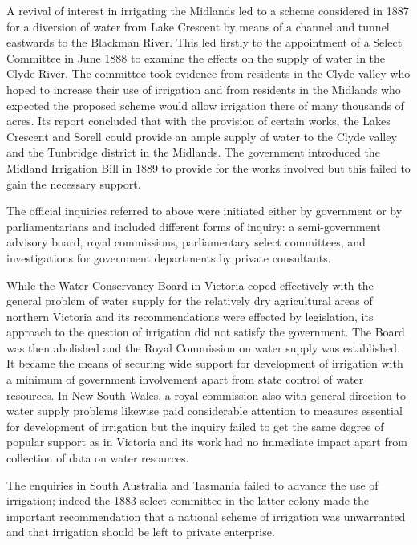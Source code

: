 A revival of interest in irrigating the Midlands led to a scheme
considered in 1887 for a diversion of water from Lake Crescent
 by means of a channel and tunnel eastwards to
the Blackman River.   This led firstly to the
appointment of a Select Committee in June 1888 to examine the effects
on the supply of water in the Clyde River.  The
committee took evidence from residents in the Clyde valley who hoped
to increase their use of irrigation and from residents in the Midlands
who expected the proposed scheme would allow irrigation there of many
thousands of acres.  Its report concluded that with the provision of
certain works, the Lakes Crescent and Sorell  could
provide an ample supply of water to the Clyde valley and the Tunbridge
district  in the Midlands.  The government introduced
the Midland Irrigation Bill  in
1889 to provide for the works involved but this failed to gain the
necessary support.

\closure
The official inquiries referred to above were initiated either by
government or by parliamentarians and included different forms of
inquiry: a semi-govern\-ment advisory board, royal commissions,
parliamentary select committees, and investigations for government
departments by private consultants.

While the Water Conservancy Board in Victoria coped effectively with
the general problem of water supply for the relatively dry
agricultural areas of northern Victoria and its recommendations were
effected by legislation, its approach to the question of irrigation
did not satisfy the government.  The Board was then abolished and the
Royal Commission on water supply was established.  It became the
means of securing wide support for development of irrigation with a
minimum of government involvement apart from state control of water
resources.  In New South Wales, a royal commission also with general
direction to water supply problems likewise paid considerable
attention to measures essential for development of irrigation but the
inquiry failed to get the same degree of popular support as in
Victoria and its work had no immediate impact apart from collection of
data on water resources.

The enquiries in South Australia and Tasmania failed to advance the
use of irrigation; indeed the 1883 select committee in the latter
colony made the important recommendation that a national scheme of
irrigation was unwarranted and that irrigation should be left to
private enterprise.

